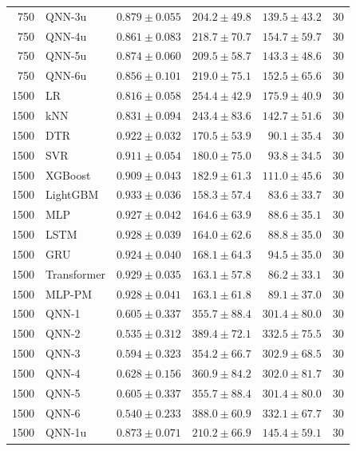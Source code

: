 \begin{longtable}{rlrrrr}
750 & QNN-3u & $0.879 \pm 0.055$ & $204.2 \pm 49.8$ & $139.5 \pm 43.2$ & 30 \\
750 & QNN-4u & $0.861 \pm 0.083$ & $218.7 \pm 70.7$ & $154.7 \pm 59.7$ & 30 \\
750 & QNN-5u & $0.874 \pm 0.060$ & $209.5 \pm 58.7$ & $143.3 \pm 48.6$ & 30 \\
750 & QNN-6u & $0.856 \pm 0.101$ & $219.0 \pm 75.1$ & $152.5 \pm 65.6$ & 30 \\
\midrule
1500 & LR & $0.816 \pm 0.058$ & $254.4 \pm 42.9$ & $175.9 \pm 40.9$ & 30 \\
1500 & kNN & $0.831 \pm 0.094$ & $243.4 \pm 83.6$ & $142.7 \pm 51.6$ & 30 \\
1500 & DTR & $0.922 \pm 0.032$ & $170.5 \pm 53.9$ & $90.1 \pm 35.4$ & 30 \\
1500 & SVR & $0.911 \pm 0.054$ & $180.0 \pm 75.0$ & $93.8 \pm 34.5$ & 30 \\
1500 & XGBoost & $0.909 \pm 0.043$ & $182.9 \pm 61.3$ & $111.0 \pm 45.6$ & 30 \\
1500 & LightGBM & $0.933 \pm 0.036$ & $158.3 \pm 57.4$ & $83.6 \pm 33.7$ & 30 \\
1500 & MLP & $0.927 \pm 0.042$ & $164.6 \pm 63.9$ & $88.6 \pm 35.1$ & 30 \\
1500 & LSTM & $0.928 \pm 0.039$ & $164.0 \pm 62.6$ & $88.8 \pm 35.0$ & 30 \\
1500 & GRU & $0.924 \pm 0.040$ & $168.1 \pm 64.3$ & $94.5 \pm 35.0$ & 30 \\
1500 & Transformer & $0.929 \pm 0.035$ & $163.1 \pm 57.8$ & $86.2 \pm 33.1$ & 30 \\
1500 & MLP-PM & $0.928 \pm 0.041$ & $163.1 \pm 61.8$ & $89.1 \pm 37.0$ & 30 \\
1500 & QNN-1 & $0.605 \pm 0.337$ & $355.7 \pm 88.4$ & $301.4 \pm 80.0$ & 30 \\
1500 & QNN-2 & $0.535 \pm 0.312$ & $389.4 \pm 72.1$ & $332.5 \pm 75.5$ & 30 \\
1500 & QNN-3 & $0.594 \pm 0.323$ & $354.2 \pm 66.7$ & $302.9 \pm 68.5$ & 30 \\
1500 & QNN-4 & $0.628 \pm 0.156$ & $360.9 \pm 84.2$ & $302.0 \pm 81.7$ & 30 \\
1500 & QNN-5 & $0.605 \pm 0.337$ & $355.7 \pm 88.4$ & $301.4 \pm 80.0$ & 30 \\
1500 & QNN-6 & $0.540 \pm 0.233$ & $388.0 \pm 60.9$ & $332.1 \pm 67.7$ & 30 \\
1500 & QNN-1u & $0.873 \pm 0.071$ & $210.2 \pm 66.9$ & $145.4 \pm 59.1$ & 30 \\

\end{longtable}
